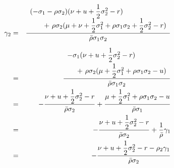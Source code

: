 \documentclass[uplatex,a4j,12pt,dvipdfmx]{jsarticle}
\begin{document}
%
%
\begin{eqnarray*}
	\gamma_{2}
	&=&
	\dfrac{
		\begin{array}{l}
			( - \sigma_{1} - \rho \sigma_{2} )
			( \nu + u + \dfrac{1}{2} \sigma_{2}^{2} - r )
			\\ \hspace{7mm} + \
			\rho \sigma_{2}
			( \mu + \nu + \dfrac{1}{2} \sigma_{1}^{2} + \rho \sigma_{1} \sigma_{2} + \dfrac{1}{2} \sigma_{2}^{2} - r )
		\end{array}
	}
	{ \bar{\rho} \sigma_{1} \sigma_{2} }
	\\[2mm] &=&
	\dfrac{
		\begin{array}{l}
			- \sigma_{1}
			(  \nu + u + \dfrac{1}{2} \sigma_{2}^{2} - r )
			\\[2mm] \hspace{5mm} + \
			\rho \sigma_{2}
			(\mu + \dfrac{1}{2} \sigma_{1}^{2} + \rho \sigma_{1} \sigma_{2} - u)
		\end{array}
	}
	{ \bar{\rho} \sigma_{1} \sigma_{2} }
	\\ &=&
	-
	\dfrac{
		\nu + u + \dfrac{1}{2} \sigma_{2}^{2} - r
	}
	{ \bar{\rho} \sigma_{2} }
	+
	\dfrac{
		\mu + \dfrac{1}{2} \sigma_{1}^{2} + \rho \sigma_{1} \sigma_{2} - u
	}
	{ \bar{\rho} \sigma_{1} }
	\\ &=&
	-
	\dfrac{
		\nu + u + \dfrac{1}{2} \sigma_{2}^{2} - r
	}
	{ \bar{\rho} \sigma_{2} }
	+
	\dfrac{
		1
	}
	{ \bar{\rho} }
	\gamma_{1}
	\\ &=&
	-
	\dfrac{
		\nu + u + \dfrac{1}{2} \sigma_{2}^{2} - r - \rho_{2} \gamma_{1}
	}
	{ \bar{\rho} \sigma_{2} }
\end{eqnarray*}
%
%
\end{document}

